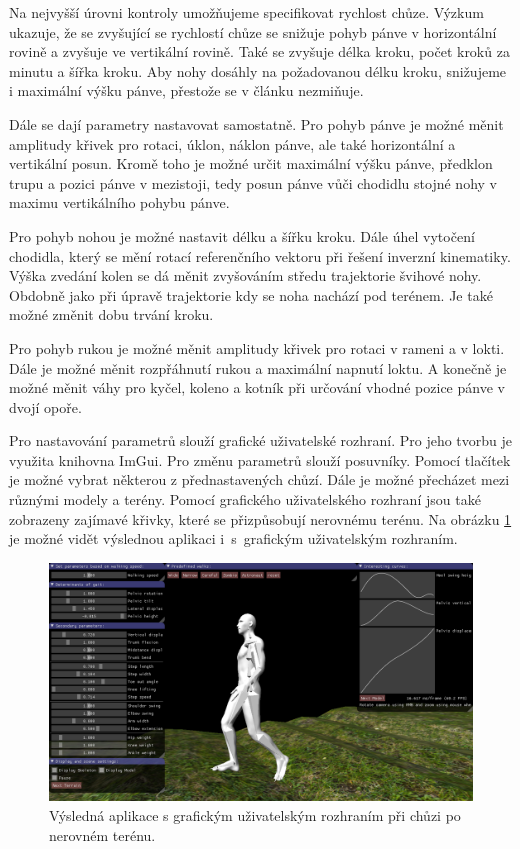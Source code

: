 Na nejvyšší úrovni kontroly umožňujeme specifikovat rychlost chůze. Výzkum \cite{orendurff2004effect} ukazuje, že se zvyšující se rychlostí chůze se snižuje pohyb pánve v horizontální rovině a zvyšuje ve vertikální rovině. Také se zvyšuje délka kroku, počet kroků za minutu a šířka kroku. Aby nohy dosáhly na požadovanou délku kroku, snižujeme i maximální výšku pánve, přestože se v článku nezmiňuje.

Dále se dají parametry nastavovat samostatně. Pro pohyb pánve je možné měnit amplitudy křivek pro rotaci, úklon, náklon pánve, ale také horizontální a vertikální posun. Kromě toho je možné určit maximální výšku pánve, předklon trupu a pozici pánve v mezistoji, tedy posun pánve vůči chodidlu stojné nohy v maximu vertikálního pohybu pánve. 

Pro pohyb nohou je možné nastavit délku a šířku kroku. Dále úhel vytočení chodidla, který se mění rotací referenčního vektoru při řešení inverzní kinematiky. Výška zvedání kolen se dá měnit zvyšováním středu trajektorie švihové nohy. Obdobně jako při úpravě trajektorie kdy se noha nachází pod terénem. Je také možné změnit dobu trvání kroku.

Pro pohyb rukou je možné měnit amplitudy křivek pro rotaci v rameni a v lokti. Dále je možné měnit rozpřáhnutí rukou a maximální napnutí loktu. A konečně je možné měnit váhy pro kyčel, koleno a kotník při určování vhodné pozice pánve v dvojí opoře.

Pro nastavování parametrů slouží grafické uživatelské rozhraní. Pro jeho tvorbu je využita knihovna ImGui. Pro změnu parametrů slouží posuvníky. Pomocí tlačítek je možné vybrat některou z přednastavených chůzí. Dále je možné přecházet mezi různými modely a terény. Pomocí grafického uživatelského rozhraní jsou také zobrazeny zajímavé křivky, které se přizpůsobují nerovnému terénu. Na obrázku \ref{fig:screen} je možné vidět výslednou aplikaci i~s~grafickým uživatelským rozhraním.

\begin{figure}[h]
	\centering
	\includegraphics[width=1.0\linewidth]{fig/screen.png}
	\caption{Výsledná aplikace s grafickým uživatelským rozhraním při chůzi po nerovném terénu.}
	\label{fig:screen}
\end{figure}

